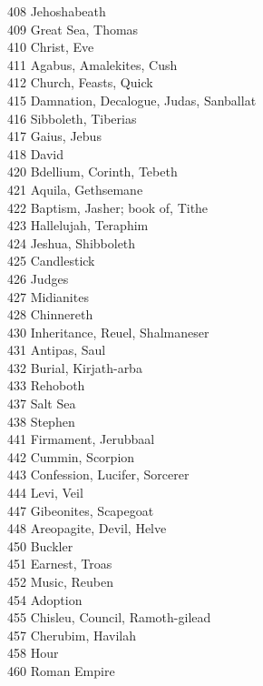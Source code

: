 408 \quad Jehoshabeath\\
409 \quad Great Sea, Thomas\\
410 \quad Christ, Eve\\
411 \quad Agabus, Amalekites, Cush\\
412 \quad Church, Feasts, Quick\\
415 \quad Damnation, Decalogue, Judas, Sanballat\\
416 \quad Sibboleth, Tiberias\\
417 \quad Gaius, Jebus\\
418 \quad David\\
420 \quad Bdellium, Corinth, Tebeth\\
421 \quad Aquila, Gethsemane\\
422 \quad Baptism, Jasher; book of, Tithe\\
423 \quad Hallelujah, Teraphim\\
424 \quad Jeshua, Shibboleth\\
425 \quad Candlestick\\
426 \quad Judges\\
427 \quad Midianites\\
428 \quad Chinnereth\\
430 \quad Inheritance, Reuel, Shalmaneser\\
431 \quad Antipas, Saul\\
432 \quad Burial, Kirjath-arba\\
433 \quad Rehoboth\\
437 \quad Salt Sea\\
438 \quad Stephen\\
441 \quad Firmament, Jerubbaal\\
442 \quad Cummin, Scorpion\\
443 \quad Confession, Lucifer, Sorcerer\\
444 \quad Levi, Veil\\
447 \quad Gibeonites, Scapegoat\\
448 \quad Areopagite, Devil, Helve\\
450 \quad Buckler\\
451 \quad Earnest, Troas\\
452 \quad Music, Reuben\\
454 \quad Adoption\\
455 \quad Chisleu, Council, Ramoth-gilead\\
457 \quad Cherubim, Havilah\\
458 \quad Hour\\
460 \quad Roman Empire\\

